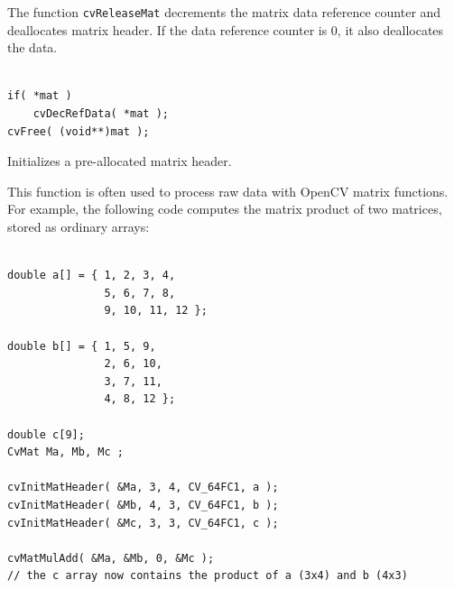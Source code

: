 The function \texttt{cvReleaseMat} decrements the matrix data reference counter and deallocates matrix header. If the data reference counter is 0, it also deallocates the data.

\begin{lstlisting}

if( *mat )
    cvDecRefData( *mat );
cvFree( (void**)mat );

\end{lstlisting}


\label{InitMatHeader}

Initializes a pre-allocated matrix header.


\begin{description}
\end{description}

This function is often used to process raw data with OpenCV matrix functions. For example, the following code computes the matrix product of two matrices, stored as ordinary arrays:

\begin{lstlisting}

double a[] = { 1, 2, 3, 4,
               5, 6, 7, 8,
               9, 10, 11, 12 };

double b[] = { 1, 5, 9,
               2, 6, 10,
               3, 7, 11,
               4, 8, 12 };

double c[9];
CvMat Ma, Mb, Mc ;

cvInitMatHeader( &Ma, 3, 4, CV_64FC1, a );
cvInitMatHeader( &Mb, 4, 3, CV_64FC1, b );
cvInitMatHeader( &Mc, 3, 3, CV_64FC1, c );

cvMatMulAdd( &Ma, &Mb, 0, &Mc );
// the c array now contains the product of a (3x4) and b (4x3)

\end{lstlisting}

